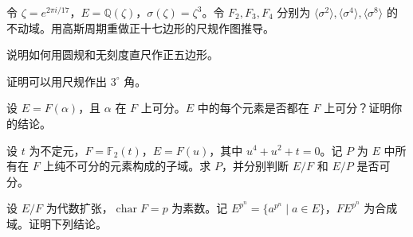 \newpage
\noindent\begin{minipage}{\textwidth}
令 $\zeta=e^{2\pi i/17}$，$E=\mathbb Q(\zeta)$，$\sigma(\zeta)=\zeta^3$。令 $F_2,F_3,F_4$ 分别为 $\langle\sigma^2\rangle,\langle\sigma^4\rangle,\langle\sigma^8\rangle$ 的不动域。用高斯周期重做正十七边形的尺规作图推导。
\end{minipage}\par\vfill
\noindent\begin{minipage}{\textwidth}
说明如何用圆规和无刻度直尺作正五边形。
\end{minipage}\par\vfill
\noindent\begin{minipage}{\textwidth}
证明可以用尺规作出 $3^\circ$ 角。
\end{minipage}\par\vfill
\newpage
\noindent\begin{minipage}{\textwidth}
设 $E=F(\alpha)$，且 $\alpha$ 在 $F$ 上可分。$E$ 中的每个元素是否都在 $F$ 上可分？证明你的结论。
\end{minipage}\par\vfill
\noindent\begin{minipage}{\textwidth}
设 $t$ 为不定元，$F=\mathbb F_2(t)$，$E=F(u)$，其中 $u^4+u^2+t=0$。记 $P$ 为 $E$ 中所有在 $F$ 上纯不可分的元素构成的子域。求 $P$，并分别判断 $E/F$ 和 $E/P$ 是否可分。
\end{minipage}\par\vfill
\noindent\begin{minipage}{\textwidth}
设 $E/F$ 为代数扩张，$\operatorname{char}F=p$ 为素数。记 $E^{p^n}=\{a^{p^n}\mid a\in E\}$，$FE^{p^n}$ 为合成域。证明下列结论。
\end{minipage}\par\vfill
